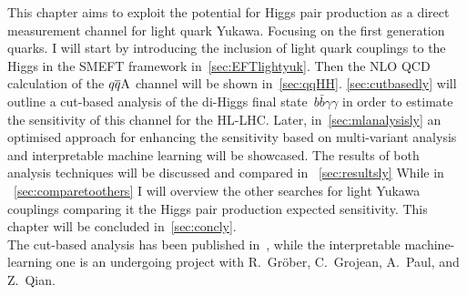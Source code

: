 This chapter aims to exploit the potential for Higgs pair production as a direct measurement channel for light quark Yukawa. Focusing on the first generation quarks.  I will start by introducing the inclusion of light quark couplings to the Higgs in the SMEFT framework in~\autoref{sec:EFTlightyuk}. Then the NLO QCD calculation of the $q\overline q \rm A$ channel will be shown in~\autoref{sec:qqHH}. \autoref{sec:cutbasedly} will outline a cut-based analysis of the di-Higgs final state~$ b \bar b \gamma \gamma$ in order to estimate the sensitivity of this channel for the HL-LHC. Later, in~\autoref{sec:mlanalysisly} an optimised approach for enhancing the sensitivity based on multi-variant analysis and interpretable machine learning will be showcased. The results of both analysis techniques will be discussed and compared in ~\autoref{sec:resultsly} While in ~\autoref{sec:comparetoothers} I will overview  the other searches for light Yukawa couplings comparing it the Higgs pair production expected sensitivity. This chapter will be concluded in~\autoref{sec:concly}. \\ The cut-based analysis has been published in~\cite{Alasfar:2019pmn}, while the interpretable machine-learning one is an undergoing project with R.~Gr\"ober, C.~Grojean, A.~Paul, and Z.~Qian. 
